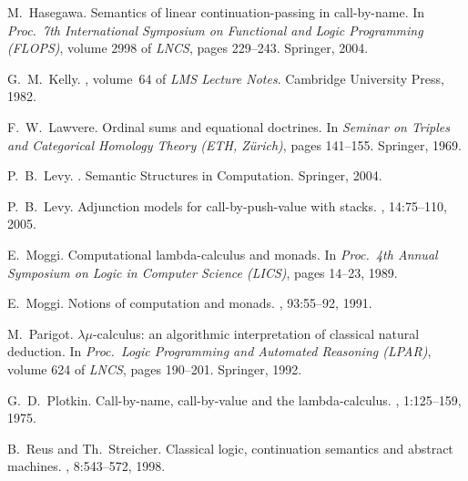 \documentclass{LMCS}
\begin{document}
\begin{thebibliography}{BORT02}
M.\ Hasegawa.
\newblock Semantics of linear continuation-passing in call-by-name.
\newblock In {\em Proc.\ 7th International Symposium on Functional and Logic
  Programming (FLOPS)}, volume 2998 of {\em LNCS}, pages 229--243. Springer,
  2004.

G.~M.\ Kelly.
, volume~64 of {\em
  LMS Lecture Notes}.
\newblock Cambridge University Press, 1982.

F.~W.\ Lawvere.
\newblock Ordinal sums and equational doctrines.
\newblock In {\em Seminar on Triples and Categorical Homology Theory (ETH,
  Z\"{u}rich)}, pages 141--155. Springer, 1969.

P.~B.\ Levy.
.
\newblock Semantic Structures in Computation. Springer, 2004.

P.~B.\ Levy.
\newblock Adjunction models for call-by-push-value with stacks.
, 14:75--110, 2005.

E.\ Moggi.
\newblock Computational lambda-calculus and monads.
\newblock In {\em Proc.\ 4th Annual Symposium on Logic in Computer Science
  (LICS)}, pages 14--23, 1989.

E.\ Moggi.
\newblock Notions of computation and monads.
, 93:55--92, 1991.

M.\ Parigot.
\newblock $\lambda\mu$-calculus: an algorithmic interpretation of classical
  natural deduction.
\newblock In {\em Proc.\ Logic Programming and Automated Reasoning (LPAR)},
  volume 624 of {\em LNCS}, pages 190--201. Springer, 1992.

G.~D.\ Plotkin.
\newblock Call-by-name, call-by-value and the lambda-calculus.
, 1:125--159, 1975.

B.\ Reus and Th.\ Streicher.
\newblock Classical logic, continuation semantics and abstract machines.
, 8:543--572, 1998.

\end{thebibliography}
\end{document}

